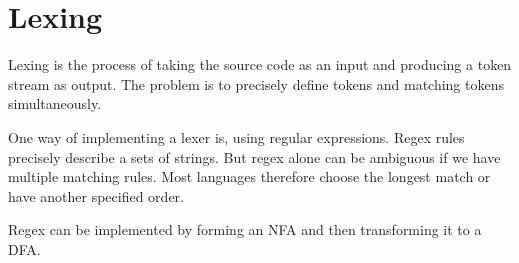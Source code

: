 \section*{Lexing}

Lexing is the process of taking the source code as an input and producing a token stream as output. The problem is to precisely define tokens and matching tokens simultaneously.\medskip

One way of implementing a lexer is, using regular expressions. Regex rules precisely describe a sets of strings. But regex alone can be ambiguous if we have multiple matching rules. Most languages therefore choose the longest match or have another specified order. \medskip

Regex can be implemented by forming an NFA and then transforming it to a DFA.
